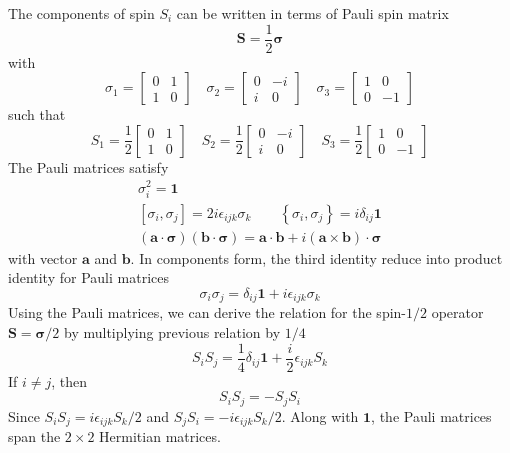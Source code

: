 \documentclass[../../../main.tex]{subfiles}
\begin{document}
The components of spin $S_i$ can be written in terms of Pauli spin matrix
\begin{equation*}
    \mathbf{S} = \frac{1 }{2 } \boldsymbol{\sigma}
\end{equation*}
with
\begin{equation*}
    \sigma_1 =
    \begin{bmatrix}
        0 & 1 \\
        1 & 0
    \end{bmatrix}
    \quad
    \sigma_2 =
    \begin{bmatrix}
        0 & -i \\
        i & 0
    \end{bmatrix}
    \quad
    \sigma_3    =
    \begin{bmatrix}
        1 & 0  \\
        0 & -1
    \end{bmatrix}
\end{equation*}
such that
\begin{equation*}
    S_1 = \frac{1}{2}
    \begin{bmatrix}
        0 & 1 \\
        1 & 0
    \end{bmatrix}
    \quad
    S_2 = \frac{1}{2}
    \begin{bmatrix}
        0 & -i \\
        i & 0
    \end{bmatrix}
    \quad
    S_3 = \frac{1}{2}
    \begin{bmatrix}
        1 & 0  \\
        0 & -1
    \end{bmatrix}
\end{equation*}
The Pauli matrices satisfy
\begin{gather*}
    \sigma_i^2=\mathbf{1}  \\
    [\sigma_i, \sigma_j] = 2i \epsilon_{ijk} \sigma_k\qquad    \left\{ \sigma_i,\sigma_j \right\} = i\delta_{ij }\mathbf{1}\\
    (\mathbf{a} \cdot \boldsymbol{\sigma})(\mathbf{b} \cdot \boldsymbol{\sigma}) = \mathbf{a} \cdot \mathbf{b} + i(\mathbf{a} \times \mathbf{b}) \cdot \boldsymbol{\sigma}
\end{gather*}
with vector $\mathbf{a}$ and $\mathbf{b}$.
In components form, the third identity reduce into product identity for Pauli matrices
\begin{equation*}
    \sigma_i \sigma_j = \delta_{ij} \mathbf{1} + i \epsilon_{ijk} \sigma_k
\end{equation*}
Using the Pauli matrices, we can derive the relation for the spin-$1/2$ operator $\mathbf{S} = \boldsymbol{\sigma}/2$ by multiplying previous relation by $1/4$
\begin{equation*}
    S_iS_j= \frac{1 }{4 }\delta_{ij}\mathbf{1} +\frac{i }{2} \epsilon_{ijk }S_k
\end{equation*}
If $i\neq j$, then
\begin{equation*}
    S_iS_j = -S_jS_i
\end{equation*}
Since $S_iS_j = i\epsilon_{ijk }S_k/2$ and $S_jS_i= -i \epsilon_{ijk }S_k/2$.
Along with $\mathbf{1}$, the Pauli matrices span the $2 \times  2$ Hermitian matrices.
\end{document}
